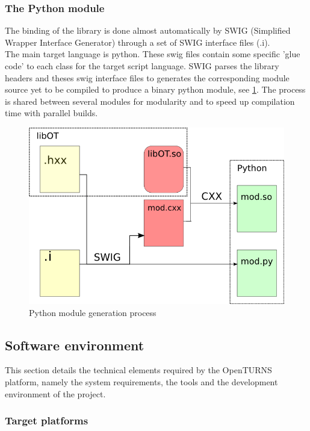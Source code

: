 \subsubsection{The Python module}

The binding of the library is done almost automatically by SWIG (Simplified Wrapper Interface Generator) through a set of SWIG interface files (.i).\\
The main target language is python.
These swig files contain some specific 'glue code' to each class for the target script language.
SWIG parses the library headers and theses swig interface files to generates the corresponding module source yet to be compiled to produce a binary python module, see \ref{fig:swig}.
The process is shared between several modules for modularity and to speed up compilation time with parallel builds.

\begin{figure}[H]
\begin{center}
\includegraphics[scale=0.5]{Figures/design/swig.png}
\caption{Python module generation process}\label{fig:swig}
\end{center}
\end{figure}

\subsection{Software environment}

This section details the technical elements required by the OpenTURNS platform, namely the system requirements, the tools and the development environment of the project.

\subsubsection{Target platforms}

